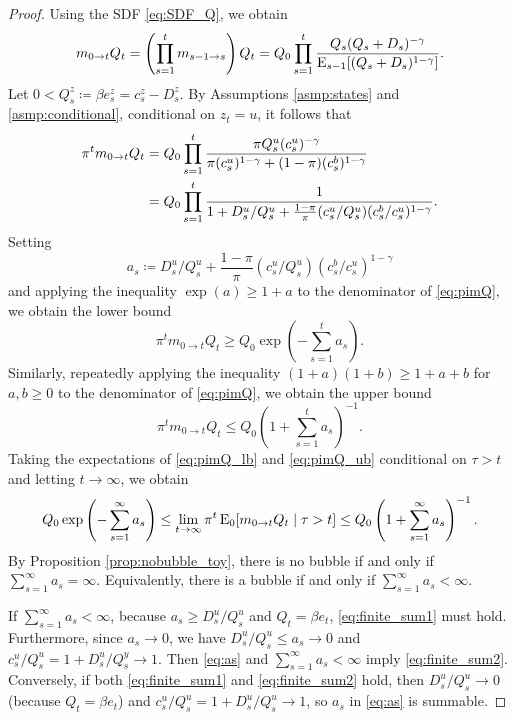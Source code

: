 \documentclass[a4paper,12pt]{article}
\numberwithin{equation}{section}
\theoremstyle{plain}
\begin{document}
\begin{proof}
Using the SDF \eqref{eq:SDF_Q}, we obtain
\begin{equation*}
    m_{0\to t}Q_t=\left(\prod_{s=1}^t m_{s-1\to s}\right)Q_t=Q_0\prod_{s=1}^t \frac{Q_s(Q_s+D_s)^{-\gamma}}{\operatorname{E}_{s-1}[(Q_s+D_s)^{1-\gamma}]}.
\end{equation*}
Let $0<Q_s^z\coloneqq \beta e_s^z=c_s^z-D_s^z$. By Assumptions \ref{asmp:states} and \ref{asmp:conditional}, conditional on $z_t=u$, it follows that
\begin{align}
    \pi^t m_{0\to t}Q_t&=Q_0\prod_{s=1}^t \frac{\pi Q_s^u(c_s^u)^{-\gamma}}{\pi (c_s^u)^{1-\gamma}+(1-\pi) (c_s^b)^{1-\gamma}} \notag \\
    &=Q_0\prod_{s=1}^t \frac{1}{1+D_s^u/Q_s^u + \frac{1-\pi}{\pi}(c_s^u/Q_s^u)(c_s^b/c_s^u)^{1-\gamma}}. \label{eq:pimQ}
\end{align}
Setting
\begin{equation}
    a_s\coloneqq D_s^u/Q_s^u+\frac{1-\pi}{\pi}(c_s^u/Q_s^u)(c_s^b/c_s^u)^{1-\gamma} \label{eq:as}
\end{equation}
and applying the inequality $\exp(a)\ge 1+a$ to the denominator of \eqref{eq:pimQ}, we obtain the lower bound
\begin{equation}
    \pi^t m_{0\to t}Q_t\ge Q_0\exp\left(-\sum_{s=1}^ta_s\right). \label{eq:pimQ_lb}
\end{equation}
Similarly, repeatedly applying the inequality $(1+a)(1+b)\ge 1+a+b$ for $a,b\ge 0$ to the denominator of \eqref{eq:pimQ}, we obtain the upper bound
\begin{equation}
    \pi^t m_{0\to t}Q_t\le Q_0\left(1+\sum_{s=1}^t a_s\right)^{-1}. \label{eq:pimQ_ub}
\end{equation}
Taking the expectations of \eqref{eq:pimQ_lb} and \eqref{eq:pimQ_ub} conditional on $\tau>t$ and letting $t\to\infty$, we obtain
\begin{equation*}
    Q_0\exp\left(-\sum_{s=1}^\infty a_s\right)\le \lim_{t\to\infty}\pi^t\operatorname{E}_0[m_{0\to t}Q_t\mid \tau>t]\le Q_0\left(1+\sum_{s=1}^\infty a_s\right)^{-1}.
\end{equation*}
By Proposition \ref{prop:nobubble_toy}, there is no bubble if and only if $\sum_{s=1}^\infty a_s=\infty$. Equivalently, there is a bubble if and only if $\sum_{s=1}^\infty a_s<\infty$.

If $\sum_{s=1}^\infty a_s<\infty$, because $a_s\ge D_s^u/Q_s^u$ and $Q_t=\beta e_t$, \eqref{eq:finite_sum1} must hold. Furthermore, since $a_s\to 0$, we have $D_s^u/Q_s^u\le a_s\to 0$ and $c_s^u/Q_s^u=1+D_s^u/Q_s^y\to 1$. Then \eqref{eq:as} and $\sum_{s=1}^\infty a_s<\infty$ imply \eqref{eq:finite_sum2}. Conversely, if both \eqref{eq:finite_sum1} and \eqref{eq:finite_sum2} hold, then $D_s^u/Q_s^u\to 0$ (because $Q_t=\beta e_t$) and $c_s^u/Q_s^u=1+D_s^u/Q_s^u\to 1$, so $a_s$ in \eqref{eq:as} is summable.
\end{proof}
\end{document}
